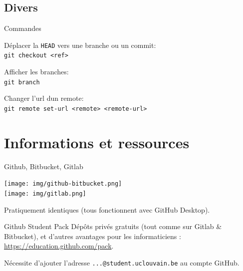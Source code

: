 \documentclass{beamer}
\begin{document}
\subsection{Divers}


\begin{frame}{Commandes}
    \begin{flushleft}
    Déplacer la \texttt{HEAD} vers une branche ou un commit: \\
    \texttt{git checkout <ref>}

    Afficher les branches: \\
    \texttt{git branch}

    Changer l'url dun remote: \\
    \texttt{git remote set-url <remote> <remote-url>} 
\end{flushleft}
\end{frame}


\section{Informations et ressources}

\begin{frame}{Github, Bitbucket, Gitlab}
    \begin{center}
        \texttt{[image: img/github-bitbucket.png]} \\
        \texttt{[image: img/gitlab.png]}
    \end{center}
    Pratiquement identiques (tous fonctionnent avec GitHub Desktop).
\end{frame}

\begin{frame}{Github Student Pack}
    Dépôts privés gratuits (tout comme sur Gitlab \& Bitbucket), et d'autres avantages pour les informaticiens : \url{https://education.github.com/pack}.

    Nécessite d'ajouter l'adresse \texttt{...@student.uclouvain.be} au compte
    GitHub.
\end{frame}
\end{document}
